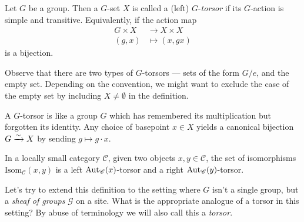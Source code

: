 \documentclass[11pt,openany]{book}
\begin{document}
\begin{definition} Let $G$ be a group. Then a $G$-set $X$ is called a (left) $G$-\textit{torsor} if its $G$-action is simple and transitive. Equivalently, if the action map
\begin{equation}\label{eqn:torsor-G-set}
\begin{aligned}
    G \times X &\to X \times X \\
    (g,x) &\mapsto (x,gx)
\end{aligned}
\end{equation}
is a bijection.
\end{definition}


Observe that there are two types of $G$-torsors --- sets of the form $G/e$, and the empty set. Depending on the convention, we might want to exclude the case of the empty set by including $X \ne \emptyset$ in the definition.

\begin{intuition} A $G$-torsor is like a group $G$ which has remembered its multiplication but forgotten its identity. Any choice of basepoint $x\in X$ yields a canonical bijection $G \xrightarrow{\sim} X$ by sending $g \mapsto g\cdot x$.
\end{intuition}

\begin{example} In a locally small category $\mathscr{C}$, given two objects $x,y \in \mathscr{C}$, the set of isomorphisms $\mathrm{Isom}_{\mathscr{C}}(x , y)$ is a left $\mathrm{Aut}_{\mathscr{C}}(x)$-torsor and a right $\mathrm{Aut}_{\mathscr{C}}(y)$-torsor.
\end{example}


Let's try to extend this definition to the setting where $G$ isn't a single group, but a \textit{sheaf of groups} $\mathcal{G}$ on a site. What is the appropriate analogue of a torsor in this setting? By abuse of terminology we will also call this a \textit{torsor}.
\end{document}
